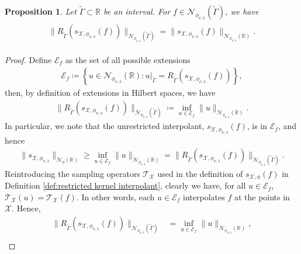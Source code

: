 \documentclass[pdflatex,sn-mathphys-num]{sn-jnl}%
\theoremstyle{thmstyleone}%
\newtheorem{proposition}{Proposition}%
\theoremstyle{thmstyletwo}%
\theoremstyle{thmstylethree}%
\begin{document}
\begin{proposition}\label{prop: matern extensions}
    Let \(\tilde{\Gamma}\subset\mathbb{R}\) be an interval. For \(f\in\mathcal{N}_{\phi_{\nu,\lambda}}(\tilde{\Gamma})\), we have
    \begin{align}
        \begin{split}
           \|R_{\tilde{\Gamma}}( s_{\mathcal{X},\phi_{\nu,\lambda}}(f))\|_{\mathcal{N}_{\phi_{\nu,\lambda}}(\tilde{\Gamma})}=\|s_{\mathcal{X},\phi_{\nu,\lambda}}(f)\|_{\mathcal{N}_{\phi_{\nu,\lambda}}(\mathbb{R})}.
        \end{split}\nonumber
    \end{align}
\end{proposition}
\begin{proof}
    Define \(\mathcal{E}_f\) as the set of all possible extensions
    \begin{align}
        \mathcal{E}_f\coloneqq\left\{u\in\mathcal{N}_{\phi_{\nu,\lambda}}(\mathbb{R}):u|_{\tilde{\Gamma}}=R_{\tilde{\Gamma}}(s_{\mathcal{X},\phi_{\nu,\lambda}}(f))\right\},\nonumber
    \end{align}
    then, by definition of extensions in Hilbert spaces, we have
    \begin{align}
        \|R_{\tilde{\Gamma}}(s_{\mathcal{X},\phi_{\nu,\lambda}}(f))\|_{\mathcal{N}_{\phi_{\nu,\lambda}}(\tilde{\Gamma})}\coloneqq\inf_{u\in \mathcal{E}_f} \|u\|_{\mathcal{N}_{\phi_{\nu,\lambda}}(\mathbb{R})}.\nonumber
    \end{align}
    In particular, we note that the unrestricted interpolant, \(s_{\mathcal{X},\phi_{\nu,\lambda}}(f)\), is in \(\mathcal{E}_f\), and hence
    \begin{align}\label{eq: restrictions geq}
        \|s_{\mathcal{X},\phi_{\nu,\lambda}}\|_{\mathcal{N}_\phi(\mathbb{R})}\geq\inf_{u\in \mathcal{E}_f} \|u\|_{\mathcal{N}_{\phi_{\nu,\lambda}}(\mathbb{R})}=\|R_{\tilde{\Gamma}}(s_{\mathcal{X},\phi_{\nu,\lambda}}(f))\|_{\mathcal{N}_{\phi_{\nu,\lambda}}(\tilde{\Gamma})}.
    \end{align}
    Reintroducing the sampling operators \(\mathcal{T}_{\mathcal{X}}\) used in the definition of \(s_{\mathcal{X},\phi}(f)\) in Definition \ref{def:restricted kernel interpolant}, clearly we have, for all \(u\in \mathcal{E}_f\), \(\mathcal{T}_{\mathcal{X}}(u)=\mathcal{T}_{\mathcal{X}}(f)\). In other words, each \(u\in \mathcal{E}_f\) interpolates \(f\) at the points in \(\mathcal{X}\). Hence,
    \begin{align}
        \|R_{\tilde{\Gamma}}(s_{\mathcal{X},\phi_{\nu,\lambda}}(f))\|_{\mathcal{N}_{\phi_{\nu,\lambda}}(\tilde{\Gamma})} &=\inf_{u\in \mathcal{E}_f} \|u\|_{\mathcal{N}_{\phi_{\nu,\lambda}}(\mathbb{R})},\nonumber\\

\end{align}
\end{proof}
\end{document}
